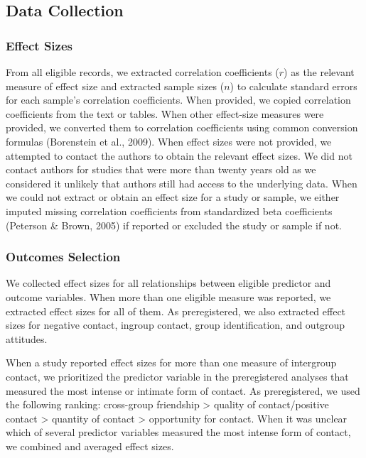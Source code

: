 \documentclass[12pt, letterpaper]{article}
\begin{document}
\hypertarget{data-collection}{%
\subsection{Data Collection}\label{data-collection}}

\hypertarget{effect-sizes}{%
\subsubsection{Effect Sizes}\label{effect-sizes}}

From all eligible records, we extracted correlation coefficients (\(r\))
as the relevant measure of effect size and extracted sample sizes
(\(n\)) to calculate standard errors for each sample's correlation
coefficients. When provided, we copied correlation coefficients from the
text or tables. When other effect-size measures were provided, we
converted them to correlation coefficients using common conversion
formulas (Borenstein et al., 2009). When effect sizes were not provided,
we attempted to contact the authors to obtain the relevant effect sizes.
We did not contact authors for studies that were more than twenty years
old as we considered it unlikely that authors still had access to the
underlying data. When we could not extract or obtain an effect size for
a study or sample, we either imputed missing correlation coefficients
from standardized beta coefficients (Peterson \& Brown, 2005) if
reported or excluded the study or sample if not.

\hypertarget{outcomes-selection}{%
\subsubsection{Outcomes Selection}\label{outcomes-selection}}

We collected effect sizes for all relationships between eligible
predictor and outcome variables. When more than one eligible measure was
reported, we extracted effect sizes for all of them. As preregistered,
we also extracted effect sizes for negative contact, ingroup contact,
group identification, and outgroup attitudes.

When a study reported effect sizes for more than one measure of
intergroup contact, we prioritized the predictor variable in the
preregistered analyses that measured the most intense or intimate form
of contact. As preregistered, we used the following ranking: cross-group
friendship \textgreater{} quality of contact/positive contact
\textgreater{} quantity of contact \textgreater{} opportunity for
contact. When it was unclear which of several predictor variables
measured the most intense form of contact, we combined and averaged
effect sizes.
\end{document}
